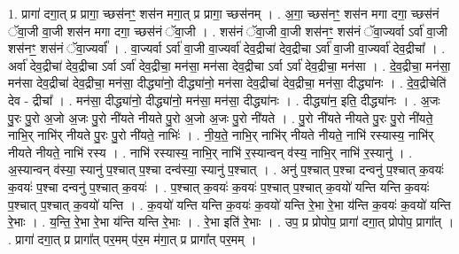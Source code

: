\documentclass[17pt]{extarticle}
\begin{document}
1. प्रागा॑ दगा॒त् प्र प्रागा॒ च्छस॑नꣳ॒॒ शस॑न मगा॒त् प्र प्रागा॒ च्छस॑नम् । . अ॒गा॒ च्छस॑नꣳ॒॒ शस॑न मगा दगा॒ च्छस॑नं ॅवा॒जी वा॒जी शस॑न मगा दगा॒ च्छस॑नं ॅवा॒जी । . शस॑नं ॅवा॒जी वा॒जी शस॑नꣳ॒॒ शस॑नं ॅवा॒ज्यर्वा ऽर्वा॑ वा॒जी शस॑नꣳ॒॒ शस॑नं ॅवा॒ज्यर्वा᳚ । . वा॒ज्यर्वा ऽर्वा॑ वा॒जी वा॒ज्यर्वा॑ देव॒द्रीचा॑ देव॒द्रीचा ऽर्वा॑ वा॒जी वा॒ज्यर्वा॑ देव॒द्रीचा᳚ । . अर्वा॑ देव॒द्रीचा॑ देव॒द्रीचा ऽर्वा ऽर्वा॑ देव॒द्रीचा॒ मन॑सा॒ मन॑सा देव॒द्रीचा ऽर्वा ऽर्वा॑ देव॒द्रीचा॒ मन॑सा । . दे॒व॒द्रीचा॒ मन॑सा॒ मन॑सा देव॒द्रीचा॑ देव॒द्रीचा॒ मन॑सा॒ दीद्ध्या॑नो॒ दीद्ध्या॑नो॒ मन॑सा देव॒द्रीचा॑ देव॒द्रीचा॒ मन॑सा॒ दीद्ध्या॑नः । . दे॒व॒द्रीचेति॑ देव - द्रीचा᳚ । . मन॑सा॒ दीद्ध्या॑नो॒ दीद्ध्या॑नो॒ मन॑सा॒ मन॑सा॒ दीद्ध्या॑नः । . दीद्ध्या॑न॒ इति॒ दीद्ध्या॑नः । . अ॒जः पु॒रः पु॒रो अ॒जो अ॒जः पु॒रो नी॑यते नीयते पु॒रो अ॒जो अ॒जः पु॒रो नी॑यते । . पु॒रो नी॑यते नीयते पु॒रः पु॒रो नी॑यते॒ नाभि॒र् नाभि॑र् नीयते पु॒रः पु॒रो नी॑यते॒ नाभिः॑ । . नी॒य॒ते॒ नाभि॒र् नाभि॑र् नीयते नीयते॒ नाभि॑ रस्यास्य॒ नाभि॑र् नीयते नीयते॒ नाभि॑ रस्य । . नाभि॑ रस्यास्य॒ नाभि॒र् नाभि॑ र॒स्यान्वन् व॑स्य॒ नाभि॒र् नाभि॑ र॒स्यानु॑ । . अ॒स्यान्वन् व॑स्या॒ स्यानु॑ प॒श्चात् प॒श्चा दन्व॑स्या॒ स्यानु॑ प॒श्चात् । . अनु॑ प॒श्चात् प॒श्चा दन्वनु॑ प॒श्चात् क॒वयः॑ क॒वयः॑ प॒श्चा दन्वनु॑ प॒श्चात् क॒वयः॑ । . प॒श्चात् क॒वयः॑ क॒वयः॑ प॒श्चात् प॒श्चात् क॒वयो॑ यन्ति यन्ति क॒वयः॑ प॒श्चात् प॒श्चात् क॒वयो॑ यन्ति । . क॒वयो॑ यन्ति यन्ति क॒वयः॑ क॒वयो॑ यन्ति रे॒भा रे॒भा य॑न्ति क॒वयः॑ क॒वयो॑ यन्ति रे॒भाः । . य॒न्ति॒ रे॒भा रे॒भा य॑न्ति यन्ति रे॒भाः । . रे॒भा इति॑ रे॒भाः । . उप॒ प्र प्रोपोप॒ प्रागा॑ दगा॒त् प्रोपोप॒ प्रागा᳚त् । . प्रागा॑ दगा॒त् प्र प्रागा᳚त् पर॒मम् प॑र॒म म॑गा॒त् प्र प्रागा᳚त् पर॒मम् । \newline
\end{document}
